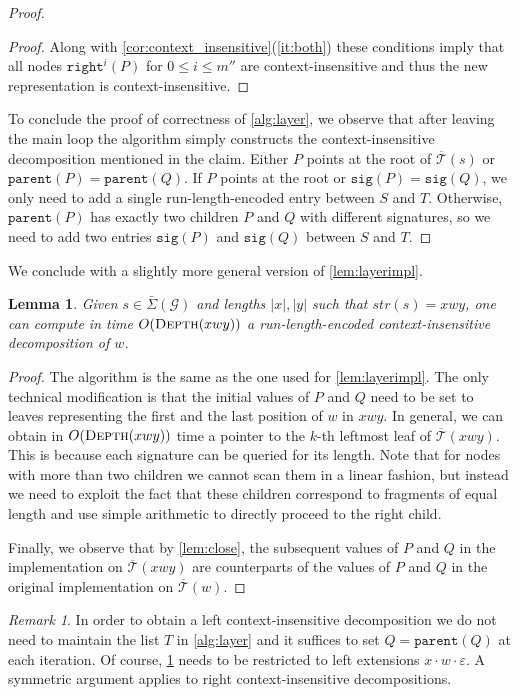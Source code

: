 \documentclass[a4paper]{article}
\newtheorem{lemma}[theorem]{Lemma}
\theoremstyle{remark}
\newtheorem{remark}[theorem]{Remark}
\newcommand{\sigs}{\bar{\Sigma}}
\newcommand{\depth}{\textsc{Depth}}
\newcommand{\grammar}{\mathcal{G}}
\newcommand{\sstr}{\textit{str}}
\newcommand{\ustree}{\mathcal{\overline{T}}}
\newcommand{\itparent}{\mathtt{parent}}
\newcommand{\itright}{\mathtt{right}}
\newcommand{\itsig}{\mathtt{sig}}
\newcommand{\eps}{\varepsilon}
\newcommand{\edot}{{\cdot}}
\begin{document}
\begin{proof}
\begin{proof}
Along with \cref{cor:context_insensitive}(\ref{it:both}) these conditions imply
 that all nodes $\itright^i(P)$ for $0 \le i \le m''$ are context-insensitive and thus the new representation is context-insensitive.
\end{proof}

To conclude the proof of correctness of \cref{alg:layer}, we observe that after leaving the main loop
the algorithm simply constructs the context-insensitive decomposition mentioned in the claim.
Either $P$ points at the root of $\ustree(s)$ or $\itparent(P)=\itparent(Q)$.
If $P$ points at the root or $\itsig(P)=\itsig(Q)$, we only need to add a single
run-length-encoded entry between $S$ and $T$.
Otherwise, $\itparent(P)$ has exactly two children $P$ and $Q$ with
different signatures, so we need to add two entries
$\itsig(P)$ and $\itsig(Q)$ between $S$ and $T$.
\end{proof}

We conclude with a slightly more general version of \cref{lem:layerimpl}.
\begin{lemma}\label{lem:layerimpl2}
Given $s\in \sigs(\grammar)$ and lengths $|x|,|y|$ such that $\sstr(s)=xwy$, one can compute in time $O(\depth(xwy))$
a run-length-encoded context-insensitive decomposition of $w$.
\end{lemma}
\begin{proof}
The algorithm is the same as the one used for  \cref{lem:layerimpl}.
The only technical modification is that the initial values of $P$ and $Q$ need to be set to leaves representing the first and the last position of $w$
in $xwy$. In general, we can obtain in $O(\depth(xwy))$ time a pointer to the $k$-th leftmost leaf of $\ustree(xwy)$.
This is because each signature can be queried for its length. Note that for nodes with more than two children we cannot scan
them in a linear fashion, but instead we need to exploit the fact that these children correspond to fragments of equal length
and use simple arithmetic to directly proceed to the right child.

Finally, we observe that by \cref{lem:close}, the subsequent values of $P$ and $Q$ in the implementation on $\ustree(xwy)$
are counterparts of the values of $P$ and $Q$ in the original implementation on $\ustree(w)$.
\end{proof}

\begin{remark}\label{remark:left-context}
In order to obtain a left context-insensitive decomposition we do not need to maintain the list $T$ in \cref{alg:layer} and it suffices to set $Q=\itparent(Q)$ at each iteration. Of course, \cref{lem:layerimpl2} needs to be restricted to left extensions
$x \edot w \edot \eps$. A symmetric argument applies to right context-insensitive decompositions.
\end{remark}
\end{document}
